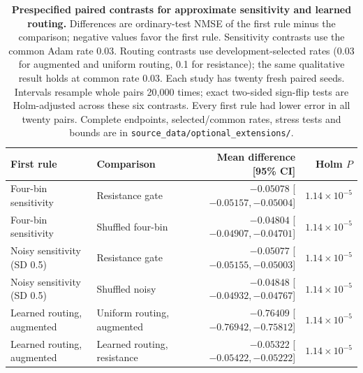 \clearpage
\begin{table}[p]
\centering
\small
\caption{\textbf{Prespecified paired contrasts for approximate sensitivity and learned routing.} Differences are ordinary-test NMSE of the first rule minus the comparison; negative values favor the first rule. Sensitivity contrasts use the common Adam rate 0.03. Routing contrasts use development-selected rates (0.03 for augmented and uniform routing, 0.1 for resistance); the same qualitative result holds at common rate 0.03. Each study has twenty fresh paired seeds. Intervals resample whole pairs 20,000 times; exact two-sided sign-flip tests are Holm-adjusted across these six contrasts. Every first rule had lower error in all twenty pairs. Complete endpoints, selected/common rates, stress tests and bounds are in \texttt{source\_data/optional\_extensions/}.}
\label{tab:optional_extensions}
\begin{tabularx}{\textwidth}{@{}X X r r@{}}
\toprule
First rule & Comparison & Mean difference [95\% CI] & Holm $P$ \\
\midrule
Four-bin sensitivity & Resistance gate & $-0.05078$ [$ -0.05157, -0.05004 $] & $1.14\times10^{-5}$ \\
Four-bin sensitivity & Shuffled four-bin & $-0.04804$ [$ -0.04907, -0.04701 $] & $1.14\times10^{-5}$ \\
Noisy sensitivity (SD 0.5) & Resistance gate & $-0.05077$ [$ -0.05155, -0.05003 $] & $1.14\times10^{-5}$ \\
Noisy sensitivity (SD 0.5) & Shuffled noisy & $-0.04848$ [$ -0.04932, -0.04767 $] & $1.14\times10^{-5}$ \\
Learned routing, augmented & Uniform routing, augmented & $-0.76409$ [$ -0.76942, -0.75812 $] & $1.14\times10^{-5}$ \\
Learned routing, augmented & Learned routing, resistance & $-0.05322$ [$ -0.05422, -0.05222 $] & $1.14\times10^{-5}$ \\
\bottomrule
\end{tabularx}
\end{table}
\clearpage
